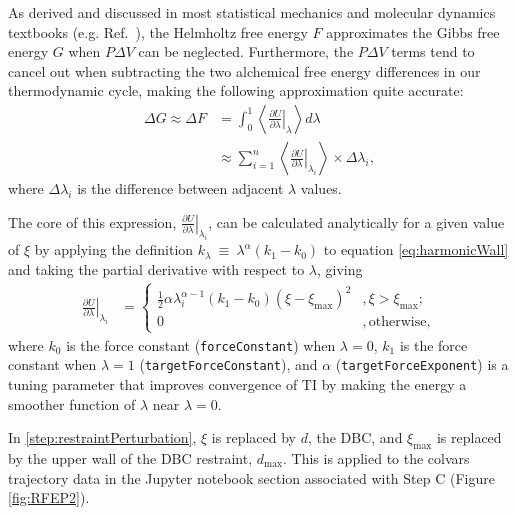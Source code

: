 \documentclass[9pt,tutorial,pubversion]{Styling/livecoms}
\begin{document}
As derived and discussed in most statistical mechanics and molecular dynamics textbooks (e.g. Ref.~), the Helmholtz free energy $F$ approximates the Gibbs free energy $G$ when $P\Delta V$ can be neglected.
Furthermore, the $P\Delta V$ terms tend to cancel out when subtracting the two alchemical free energy differences in our thermodynamic cycle, making the following approximation quite accurate:
\begin{align}\label{eq:thermodynamicintegration}
    \Delta G \approx \Delta F &= \int_{0}^{1} \left\langle \left.\frac{\partial U}{\partial \lambda}\right|_{\lambda} \right\rangle d\lambda\\
    &\approx \sum_{i=1}^n \left\langle \left.
    \frac{\partial U}{\partial \lambda} \right|_{\lambda_i} \right\rangle \times \Delta \lambda_i,
\end{align}
where $\Delta \lambda_i$ is the difference between adjacent $\lambda$ values.

The core of this expression, $\left.\frac{\partial U}{\partial \lambda}\right|_{\lambda_i}$, can be calculated analytically for a given value of $\xi$ by applying the definition $k_\lambda~\equiv~\lambda^\alpha\left (k_1-k_0\right )$ to equation \ref{eq:harmonicWall} and taking the partial derivative with respect to $\lambda$, giving
 \begin{align}\label{eq:dUwalldLambda}
    \left. \frac{\partial U}{\partial \lambda} \right|_{\lambda_i} &=\begin{cases}
        \frac{1}{2}\alpha\lambda_i^{\alpha-1}(k_1 - k_0)(\xi-\xi_\mathrm{max})^2&, \xi>\xi_\mathrm{max};\\
        0 &, \text{otherwise},
    \end{cases} 
 \end{align}
where $k_0$ is the force constant (\texttt{forceConstant}) when $\lambda=0$, $k_1$ is the  force constant when $\lambda=1$ (\texttt{targetForceConstant}), and $\alpha$ (\texttt{targetForceExponent}) is a tuning parameter that improves convergence of TI by making the energy a smoother function of $\lambda$ near $\lambda=0$.

In \ref{step:restraintPerturbation}, $\xi$ is replaced by $d$, the DBC, and $\xi_\mathrm{max}$ is replaced by the upper wall of the DBC restraint, $d_\mathrm{max}$.
This is applied to the colvars trajectory data in the Jupyter notebook section associated with Step C (Figure \ref{fig:RFEP2}). 
\end{document}
